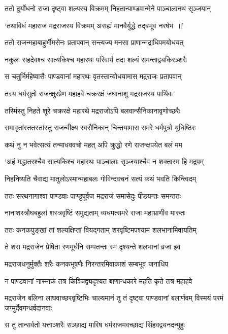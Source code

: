 \threelineshloka
{ततो दुर्योधनो राजा दृष्ट्वा शल्यस्य विक्रमम्}
{निहतान्पाण्डवान्मेने पाञ्चालानथ सृञ्जयान्}
{}


\twolineshloka
{`तथाविधं महाराज मद्रराजस्य विक्रमम्}
{असह्यं मानवैर्युद्धे तद्बभूव नरर्षभ ॥'}


\twolineshloka
{ततो राजन्महाबाहुर्भीमसेनः प्रतापवान्}
{सन्त्यज्य मनसा प्राणान्मद्राधिपमयोधयत्}


\twolineshloka
{नकुलः सहदेवश्च सात्यकिश्च महारथः}
{परिवार्य तदा शल्यं समन्ताद्व्यकिरञ्शरैः}


\twolineshloka
{स चतुर्भिर्महेष्वासैः पाण्डवानां महारथः}
{वृतस्तान्योधयामास मद्रराजः प्रतापवान्}


\twolineshloka
{तस्य धर्मसुतो राजन्क्षुरप्रेण महाहवे}
{चक्ररक्षं जघानाशु मद्रराजस्य पार्थिवः}


\twolineshloka
{तस्मिंस्तु निहते शूरे चक्ररक्षे महारथे}
{मद्रराजोऽपि बलवान्सैनिकानावृणोच्छरैः}


\twolineshloka
{समावृतांस्ततस्तांस्तु राजन्वीक्ष्य स्वसैनिकान्}
{चिन्तयामास समरे धर्मपुत्रो युधिष्ठिरः}


\twolineshloka
{कथं नु न भवेत्सत्यं तन्माधववचो महत्}
{अपि क्रुद्धो रणे राजन्क्षपयेत बलं मम}


\twolineshloka
{`अहं मद्धातरश्चैव सात्यकिश्च महारथः}
{पाञ्चालाः सृञ्जयाश्चैव न शक्तास्म हि मद्रपम्}


\twolineshloka
{निहनिष्यति चैवाद्य मातुलोऽस्मान्महाबलः}
{गोविन्दवचनं सत्यं कथं भवति किन्त्विदम्}


\twolineshloka
{ततः सरथनागाश्वा पाण्डवाः पाण्डुपूर्वज}
{मद्रराजं समासेदुः पीडयन्तः समन्ततः}


\twolineshloka
{नानाशस्त्रौघबहुलां शस्त्रवृष्टिं समुद्यताम्}
{व्यधमत्समरे राजा महाभ्राणीव मारुतः}


\twolineshloka
{ततः कनकपुङ्खां तां शल्यक्षिप्तां वियद्गताम्}
{शरवृष्टिमपश्याम शलभानामिवायतिम्}


\twolineshloka
{ते शरा मद्रराजेन प्रेषिता रणमूर्धनि}
{सम्पतन्तः स्म दृश्यन्ते शलभानां व्रजा इव}


\twolineshloka
{मद्रराजधनुर्मुक्तैः शरैः कनकभूषणैः}
{निरन्तरमिवाकाशं सम्बभूव जनाधिप}


\twolineshloka
{न पाण्डवानां नास्माकं तत्र किञ्चिद्व्यदृश्यत}
{बाणान्धकारे महति कृते तत्र महाहवे}


\threelineshloka
{मद्रराजेन बलिना लाघवाच्छरवृष्टिभिः}
{चाल्यमानं तु तं दृष्ट्वा पाण्डवानां बलार्णवम्}
{विस्मयं परमं जग्मुर्देवगन्धर्वदानवाः}


\twolineshloka
{स तु तान्सर्वतो यत्ताञ्शरैः सञ्छाद्य मारिष}
{धर्मराजमवच्छाद्य सिंहवद्व्यनदन्मुहुः}


